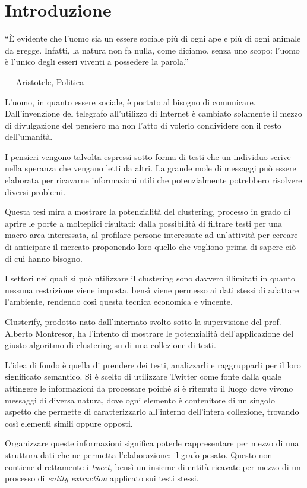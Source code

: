 \chapter{Introduzione}

\epigraph{``È evidente che l’uomo sia un essere sociale più di ogni ape e più di ogni animale da gregge. Infatti, la natura non fa nulla, come diciamo, senza uno scopo: l’uomo è l’unico degli esseri viventi a possedere la parola.''}{--- \textup{Aristotele}, Politica }

L'uomo, in quanto essere sociale, è portato al bisogno di comunicare. Dall'invenzione del telegrafo all'utilizzo di Internet è cambiato solamente il mezzo di divulgazione del pensiero ma non l'atto di volerlo condividere con il resto dell'umanità.

I pensieri vengono talvolta espressi sotto forma di testi che un individuo scrive nella speranza che vengano letti da altri. La grande mole di messaggi può essere elaborata per ricavarne informazioni utili che potenzialmente potrebbero risolvere diversi problemi.

Questa tesi mira a mostrare la potenzialità del clustering, processo in grado di aprire le porte a molteplici risultati: dalla possibilità di filtrare testi per una macro-area interessata, al profilare persone interessate ad un’attività per cercare di anticipare il mercato proponendo loro quello che vogliono prima di sapere ciò di cui hanno bisogno.

I settori nei quali si può utilizzare il clustering sono davvero illimitati in quanto nessuna restrizione viene imposta, bensì viene permesso ai dati stessi di adattare l’ambiente, rendendo così questa tecnica economica e vincente.

Clusterify, prodotto nato dall'internato svolto sotto la supervisione del prof. Alberto Montresor, ha l'intento di mostrare le potenzialità dell'applicazione del giusto algoritmo di clustering su di una collezione di testi. 

L'idea di fondo è quella di prendere dei testi, analizzarli e raggrupparli per il loro significato semantico. Si è scelto di utilizzare Twitter come fonte dalla quale attingere le informazioni da processare poiché si è ritenuto il luogo dove vivono messaggi di diversa natura, dove ogni elemento è contenitore di un singolo aspetto che permette di caratterizzarlo all'interno dell'intera collezione, trovando così elementi simili oppure opposti. 

Organizzare queste informazioni significa poterle rappresentare per mezzo di una struttura dati che ne permetta l'elaborazione: il grafo pesato. Questo non contiene direttamente i \emph{tweet}, bensì un insieme di entità ricavate per mezzo di un processo di \emph{entity extraction} applicato sui testi stessi.

